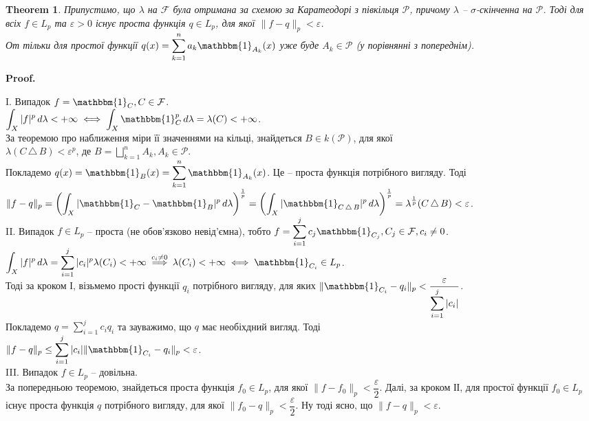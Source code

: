 \documentclass[a4paper, 10pt]{article}
\makeatletter
\theoremstyle{theoremdd}
\newtheorem{theorem}{Theorem}[subsection]
\renewenvironment{proof}[1][Proof.\\]{\par
\pushQED{\hfill \qed}%
\normalfont \topsep6\p@\@plus6\p@\relax
\trivlist
\item\relax
{\bfseries
#1\@addpunct{.}}\hspace\labelsep\ignorespaces
}{%
\popQED\endtrivlist\@endpefalse
}
\newcommand{\symdif}{\,\triangle\,} %
\makeatother
\begin{document}
\begin{theorem}
Припустимо, що $\lambda$ на $\mathcal{F}$ була отримана за схемою за Каратеодорі з півкільця $\mathcal{P}$, причому $\lambda$ -- $\sigma$-скінченна на $\mathcal{P}$. Тоді для всіх $f \in L_p$ та $\varepsilon >0$ існує проста функція $q \in L_p$, для якої $\|f-q\|_p < \varepsilon$.\\
От тільки для простої функції $q(x) = \displaystyle\sum_{k=1}^n a_k \mathbbm{1}_{A_k}(x)$ уже буде $A_k \in \mathcal{P}$ (у порівнянні з попереднім).
\end{theorem}

\begin{proof}
I. Випадок $f = \mathbbm{1}_C, C \in \mathcal{F}$.\\
$\displaystyle\int_X |f|^p\,d\lambda < +\infty \iff \int_X \mathbbm{1}_C^p\,d\lambda = \lambda(C) < +\infty$.\\
За теоремою про наближення міри її значеннями на кільці, знайдеться $B \in k(\mathcal{P})$, для якої \\ $\lambda(C \symdif B) < \varepsilon^p$, де $B = \displaystyle\bigsqcup_{k=1}^n A_k, A_k \in \mathcal{P}$.\\
Покладемо $q(x) = \mathbbm{1}_B(x) = \displaystyle\sum_{k=1}^n \mathbbm{1}_{A_k}(x)$. Це -- проста функція потрібного вигляду. Тоді\\
$\|f-q\|_p = \displaystyle \left(\int_X |\mathbbm{1}_C - \mathbbm{1}_B|^p\,d\lambda \right)^{\frac{1}{p}} = \left( \int_X |\mathbbm{1}_{C \symdif B}|^p\,d\lambda \right)^{\frac{1}{p}} = \lambda^{\frac{1}{p}}(C \symdif B) < \varepsilon$.
\bigskip \\
II. Випадок $f \in L_p$ -- проста (не обов'язково невід'ємна), тобто $f = \displaystyle\sum_{i=1}^j c_j \mathbbm{1}_{C_j}, C_j \in \mathcal{F}, c_i \neq 0$.\\
$\displaystyle\int_X |f|^p\,d\lambda = \sum_{i=1}^j |c_i|^p \lambda(C_i) < +\infty \overset{c_i \neq 0}{\implies} \lambda(C_i) < +\infty \iff \mathbbm{1}_{C_i} \in L_p$.\\
Тоді за кроком І, візьмемо прості функції $q_i$ потрібного вигляду, для яких $\| \mathbbm{1}_{C_i} - q_i \|_p < \dfrac{\varepsilon}{\displaystyle\sum_{i=1}^j |c_i|}$.\\
Покладемо $q = \displaystyle\sum_{i=1}^j c_i q_i$ та зауважимо, що $q$ має необіхдний вигляд. Тоді\\
$\|f-q\|_p \leq \displaystyle\sum_{i=1}^j |c_i| \|\mathbbm{1}_{C_i} - q_i\|_p < \varepsilon$.
\bigskip \\
III. Випадок $f \in L_p$ -- довільна.\\
За попередньою теоремою, знайдеться проста функція $f_0 \in L_p$, для якої $\|f-f_0\|_p < \dfrac{\varepsilon}{2}$. Далі, за кроком ІІ, для простої функції $f_0 \in L_p$ існує проста функція $q$ потрібного вигляду, для якої $\|f_0-q\|_p < \dfrac{\varepsilon}{2}$. Ну тоді ясно, що $\|f-q\|_p < \varepsilon$.
\end{proof}
\end{document}
